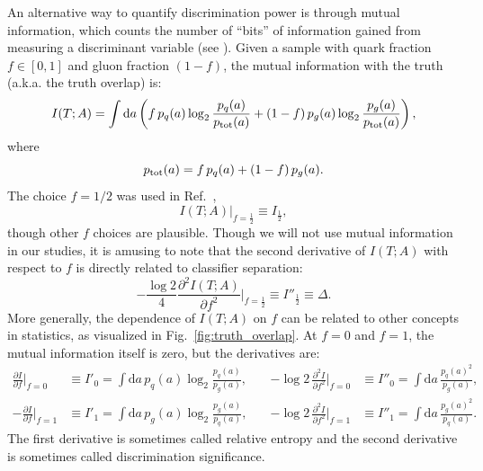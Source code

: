 \documentclass[11pt,letterpaper]{article}
\newcommand{\df}{\text{d}}
\DeclareRobustCommand{\Fig}[1]{Fig.~\ref{#1}}
\DeclareRobustCommand{\Ref}[1]{Ref.~\cite{#1}}
\newcommand{\be}{\begin{equation}}
\newcommand{\ee}{\end{equation}}
\begin{document}

An alternative way to quantify discrimination power is through mutual information, which counts the number of ``bits'' of information gained from measuring a discriminant variable (see \cite{Larkoski:2014pca}).  Given a sample with quark fraction $f \in [0,1]$ and gluon fraction $(1-f)$, the mutual information with the truth (a.k.a. the truth overlap) is:
\be
I(T;A) = \int \df a \left(f \, p_q(a) \log_2 \frac{p_q(a)}{p_{\rm tot}(a)} + (1-f) \, p_g(a) \log_2 \frac{p_g(a)}{p_{\rm tot}(a)}   \right),
\ee
where
\be
p_{\rm tot}(a) = f \, p_q(a) + (1-f) \, p_g(a).
\ee
The choice $f = 1/2$ was used in \Ref{Larkoski:2014pca},
\be
I(T;A)\big|_{f = \frac{1}{2}} \equiv I_{\frac{1}{2}},
\ee though other $f$ choices are plausible.  Though we will not use mutual information in our studies, it is amusing to note that the second derivative of $I(T;A)$ with respect to $f$ is directly related to classifier separation:
\be
- \frac{\log 2}{4} \frac{\partial^2 I(T;A)}{\partial f^2} \Big|_{f = \frac{1}{2}} \equiv I''_\frac{1}{2} \equiv \Delta.
\ee
More generally, the dependence of $I(T;A)$ on $f$ can be related to other concepts in statistics, as visualized in \Fig{fig:truth_overlap}.  At $f = 0$ and $f = 1$, the mutual information itself is zero, but the derivatives are:
\begin{align}
\frac{\partial I}{\partial f} \Big|_{f = 0} &\equiv I'_0 = \int \df a \, p_q(a)  \log_2 \frac{p_q(a)}{p_g(a)}, \quad &- \log 2 \,  \frac{\partial^2 I}{\partial f^2} \Big|_{f = 0} &\equiv I''_0 = \int \df a \,  \frac{p_q(a)^2}{p_g(a)},\\
- \frac{\partial I}{\partial f} \Big|_{f = 1} &\equiv I'_1 = \int \df a \, p_g(a) \log_2 \frac{p_g(a)}{p_q(a)}, \quad &- \log 2 \, \frac{\partial^2 I}{\partial f^2} \Big|_{f = 1} &\equiv I''_1 = \int \df a \, \frac{p_g(a)^2}{p_q(a)}.
\end{align}
The first derivative is sometimes called relative entropy and the second derivative is sometimes called discrimination significance.  

\end{document}
